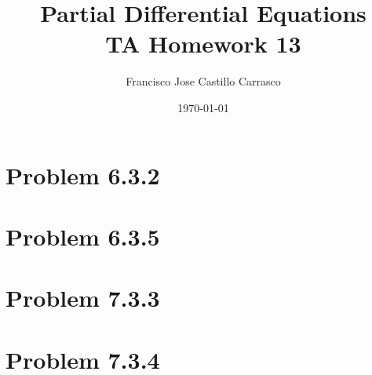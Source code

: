 




\title{Partial Differential Equations\\TA Homework 13}
\author{Francisco Jose Castillo Carrasco}
\date{\today}
\maketitle




\section*{Problem 6.3.2}

\newpage
\section*{Problem 6.3.5}

\newpage
\section*{Problem 7.3.3}

\newpage
\section*{Problem 7.3.4}


